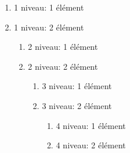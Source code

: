 \documentclass{article}
\begin{document}
\begin{enumerate}
  \item 1\ier{} niveau: 1\ier{} élément
  \item 1\ier{} niveau: 2\ieme{} élément
  \begin{enumerate}
    \item 2\ieme{} niveau: 1\ier{} élément
    \item 2\ieme{} niveau: 2\ieme{} élément
    \begin{enumerate}
      \item 3\ieme{} niveau: 1\ier{} élément
      \item 3\ieme{} niveau: 2\ieme{} élément
        \begin{enumerate}
          \item 4\ieme{} niveau: 1\ier{} élément
          \item 4\ieme{} niveau: 2\ieme{} élément
        \end{enumerate}
    \end{enumerate}
  \end{enumerate}
\end{enumerate}
\end{document}
